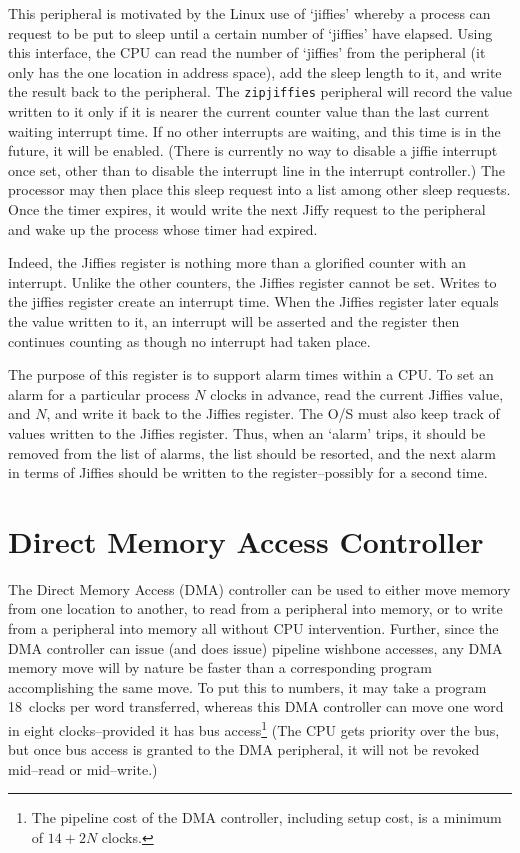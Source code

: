 \documentclass{gqtekspec}
\begin{document}
This peripheral is motivated by the Linux use of `jiffies' whereby a process
can request to be put to sleep until a certain number of `jiffies' have
elapsed.  Using this interface, the CPU can read the number of `jiffies'
from the peripheral (it only has the one location in address space), add the
sleep length to it, and write the result back to the peripheral.  The
{\tt zipjiffies}
peripheral will record the value written to it only if it is nearer the current
counter value than the last current waiting interrupt time.  If no other 
interrupts are waiting, and this time is in the future, it will be enabled.
(There is currently no way to disable a jiffie interrupt once set, other
than to disable the interrupt line in the interrupt controller.)  The processor
may then place this sleep request into a list among other sleep requests.
Once the timer expires, it would write the next Jiffy request to the peripheral
and wake up the process whose timer had expired.

Indeed, the Jiffies register is nothing more than a glorified counter with
an interrupt.  Unlike the other counters, the Jiffies register cannot be set.
Writes to the jiffies register create an interrupt time.  When the Jiffies
register later equals the value written to it, an interrupt will be asserted
and the register then continues counting as though no interrupt had taken
place.

The purpose of this register is to support alarm times within a CPU.  To
set an alarm for a particular process $N$ clocks in advance, read the current
Jiffies value, and $N$, and write it back to the Jiffies register.  The
O/S must also keep track of values written to the Jiffies register.  Thus,
when an `alarm' trips, it should be removed from the list of alarms, the list
should be resorted, and the next alarm in terms of Jiffies should be written
to the register--possibly for a second time.

\section{Direct Memory Access Controller}

The Direct Memory Access (DMA) controller can be used to either move memory
from one location to another, to read from a peripheral into memory, or to
write from a peripheral into memory all without CPU intervention.  Further,
since the DMA controller can issue (and does issue) pipeline wishbone accesses,
any DMA memory move will by nature be faster than a corresponding program
accomplishing the same move.  To put this to numbers, it may take a program
18~clocks per word transferred, whereas this DMA controller can move one
word in eight clocks--provided it has bus access\footnote{The pipeline cost of 
the DMA controller, including setup cost, is a minimum of $14+2N$ clocks.}
(The CPU gets priority over the bus, but once bus access is granted to the
DMA peripheral, it will not be revoked mid--read or mid--write.)
\end{document}
